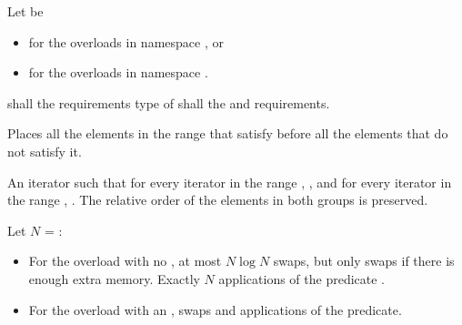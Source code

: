 \begin{itemdescr}
\begin{addedblock}
\pnum
Let  be
\begin{itemize}
\item {} for the overloads in namespace , or
\item {} for the overloads in
  namespace .
\end{itemize}
\end{addedblock}

\pnum
\requires
{}
 shall  the
 requirements  type of  shall 
 the
 and
 requirements.

\pnum
\effects
Places all the elements in the range
that satisfy   before all the
elements that do not satisfy it.

\pnum
\returns
An iterator
such that for every iterator
in the range
,
,
and for every iterator
in the range
,
.
The relative order of the elements in both groups is preserved.

\pnum
\complexity
Let $N$ = :
\begin{itemize}
\item For the overload with no ,
at most $N \log N$ swaps,
but only  swaps if there is enough extra memory.
Exactly $N$ applications of the predicate .
\item For the overload with an ,
 swaps and  applications of the predicate.
\end{itemize}
\end{itemdescr}


